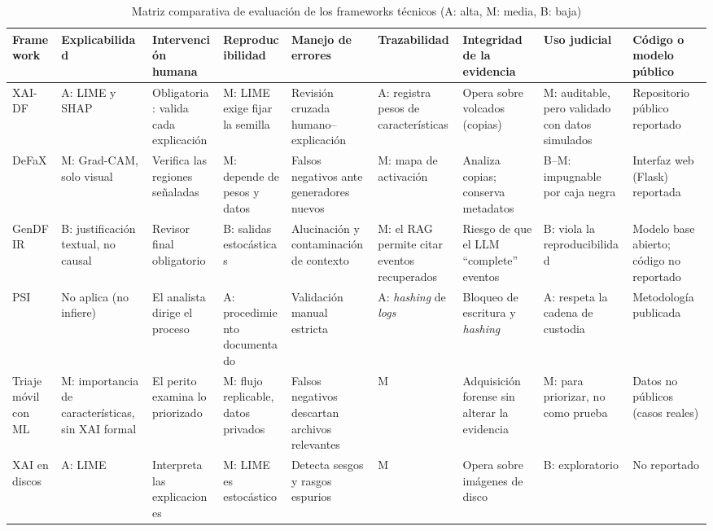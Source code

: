 \documentclass[journal]{IEEEtran}
\begin{document}
\begin{table}[!t]
\renewcommand{\arraystretch}{1.25}
\setlength{\tabcolsep}{2.5pt}
\caption{Matriz comparativa de evaluación de los frameworks técnicos (A: alta, M: media, B: baja)}
\label{tab:fw_eval}
\centering
\scriptsize
\begin{tabular}{|L{1.7cm}|L{1.85cm}|L{1.85cm}|L{1.85cm}|L{1.9cm}|L{1.85cm}|L{1.85cm}|L{1.85cm}|L{1.8cm}|}
\hline
\textbf{Framework} & \textbf{Explicabilidad} & \textbf{Intervención humana} & \textbf{Reproducibilidad} & \textbf{Manejo de errores} & \textbf{Trazabilidad} & \textbf{Integridad de la evidencia} & \textbf{Uso judicial} & \textbf{Código o modelo público} \\
\hline
XAI-DF & A: LIME y SHAP & Obligatoria: valida cada explicación & M: LIME exige fijar la semilla & Revisión cruzada humano--explicación & A: registra pesos de características & Opera sobre volcados (copias) & M: auditable, pero validado con datos simulados & Repositorio público reportado \\
\hline
DeFaX & M: Grad-CAM, solo visual & Verifica las regiones señaladas & M: depende de pesos y datos & Falsos negativos ante generadores nuevos & M: mapa de activación & Analiza copias; conserva metadatos & B--M: impugnable por caja negra & Interfaz web (Flask) reportada \\
\hline
GenDFIR & B: justificación textual, no causal & Revisor final obligatorio & B: salidas estocásticas & Alucinación y contaminación de contexto & M: el RAG permite citar eventos recuperados & Riesgo de que el LLM ``complete'' eventos & B: viola la reproducibilidad & Modelo base abierto; código no reportado \\
\hline
PSI & No aplica (no infiere) & El analista dirige el proceso & A: procedimiento documentado & Validación manual estricta & A: \textit{hashing} de \textit{logs} & Bloqueo de escritura y \textit{hashing} & A: respeta la cadena de custodia & Metodología publicada \\
\hline
Triaje móvil con ML & M: importancia de características, sin XAI formal & El perito examina lo priorizado & M: flujo replicable, datos privados & Falsos negativos descartan archivos relevantes & M & Adquisición forense sin alterar la evidencia & M: para priorizar, no como prueba & Datos no públicos (casos reales) \\
\hline
XAI en discos & A: LIME & Interpreta las explicaciones & M: LIME es estocástico & Detecta sesgos y rasgos espurios & M & Opera sobre imágenes de disco & B: exploratorio & No reportado \\

\end{tabular}
\end{table}
\end{document}
